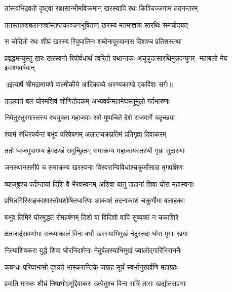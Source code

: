 \twolineshloka
{तांस्त्वभिद्रवतो दृष्ट्वा राक्षसान्भीमविक्रमान्}
{खरस्यापि रथः किञ्चिज्जगाम तदनन्तरम्} %

\twolineshloka
{ततस्ताञ्शबलानश्वांस्तप्तकाञ्चनभूषितान्}
{खरस्य मतमाज्ञाय सारथिः समचोदयत्} %

\twolineshloka
{स चोदितो रथः शीघ्रं खरस्य रिपुघातिनः}
{शब्देनापूरयामास दिशश्च प्रतिशस्तथा} %

\fourlineindentedshloka
{प्रवृद्धमन्युस्तु खरः खरस्वनो}
{रिपोर्वधार्थं त्वरितो यथान्तकः}
{अचूचुदत्सारथिमुन्नदन्पुनर्-}
{महाबलो मेघ इवाश्मवर्षवान्} %


{॥इत्यार्षे श्रीमद्रामायणे वाल्मीकीये आदिकाव्ये अरण्यकाण्डे एकविंशः सर्गः॥}


\twolineshloka
{तत्प्रयातं बलं घोरमशिवं शोणितोदकम्}
{अभ्यवर्षन्महामेघस्तुमुलो गर्दभारुणः} %

\twolineshloka
{निपेतुस्तुरगास्तस्य रथयुक्ता महाजवाः}
{समे पुष्पचिते देशे राजमार्गे यदृच्छया} %

\twolineshloka
{श्यामं रुधिरपर्यन्तं बभूव परिवेषणम्}
{अलातचक्रप्रतिमं प्रतिगृह्य दिवाकरम्} %

\twolineshloka
{ततो ध्वजमुपागम्य हेमदण्डं समुच्छ्रितम्}
{समाक्रम्य महाकायस्तस्थौ गृध्रः सुदारुणः} %

\twolineshloka
{जनस्थानसमीपे च समाक्रम्य खरस्वनाः}
{विस्वरान्विविधांश्चक्रुर्मांसादा मृगपक्षिणः} %

\twolineshloka
{व्याजह्रुश्च पदीप्तायां दिशि वै भैरवस्वनम्}
{अशिवा यातु दाहानां शिवा घोरा महास्वनाः} %

\twolineshloka
{प्रभिन्नगिरिसङ्काशास्तोयशोषितधारिणः}
{आकाशं तदनाकाशं चक्रुर्भीमा बलाहकाः} %

\twolineshloka
{बभूव तिमिरं घोरमुद्धतं रोमहर्षणम्}
{दिशो वा विदिशो वापि सुव्यक्तं न चकाशिरे} %

\twolineshloka
{क्षतजार्द्रसवर्णाभा सन्ध्याकालं विना बभौ}
{खरस्याभिमुखं नेदुस्तदा घोरा मृगाः खगाः} %

\twolineshloka
{नित्याशिवकरा युद्धे शिवा घोरनिदर्शनाः}
{नेदुर्बलस्याभिमुखं ज्वालोद्गारिभिराननैः} %

\twolineshloka
{कबन्धः परिघाभासो दृश्यते भास्करान्तिके}
{जग्राह सूर्यं स्वर्भानुरपर्वणि महाग्रहः} %

\twolineshloka
{प्रवाति मारुतः शीघ्रं निष्प्रभोऽभूद्दिवाकरः}
{उत्पेतुश्च विना रात्रिं ताराः खद्योतसप्रभाः} %


